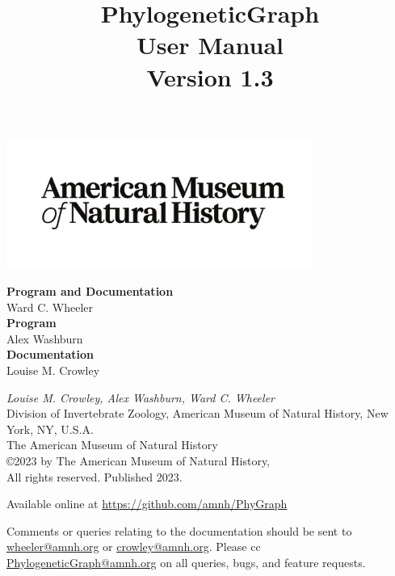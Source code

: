 \documentclass[11pt]{book}
\begin{document}
	
	\title{PhylogeneticGraph\\User Manual\\Version 1.3}
	
	\maketitle 
	
	\newpage

	 \begin{center}
		\includegraphics[width=0.75\textwidth]{AMNHLogo.PDF}
	\end{center}

	\vspace*{2.50cm}
		
	\begin{flushleft}
		\textbf {Program and Documentation} \\ Ward C. Wheeler \\
		\vspace*{0.50cm}
		\textbf {Program} \\ Alex Washburn \\
		\vspace*{0.50cm}
		\textbf{Documentation} \\ Louise M. Crowley
	\end{flushleft}
	

	\vspace*{2.50cm}
	
	\begin{flushleft}
		\small
		{\it Louise M. Crowley, Alex Washburn, Ward C. Wheeler} \\
		
		Division of Invertebrate Zoology, American Museum of Natural History, New York, NY, U.S.A.\\
		\smallskip
		The American Museum of Natural History\\
		\copyright 2023 by The American Museum of Natural History, \\
		All rights reserved. Published 2023.
			
		\vspace*{0.25cm}
		
		Available online at \url{https://github.com/amnh/PhyGraph}
		
		Comments or queries relating to the documentation should be sent to \href{mailto:wheeler@amnh.org}
		{wheeler@amnh.org} or \href{mailto:crowley@amnh.org}{crowley@amnh.org}. Please cc  	
		\href{mailto:PhylogeneticGraph@amnh.org}{PhylogeneticGraph@amnh.org}
		on all queries, bugs,  and feature requests.
	
	\end{flushleft}
	
\end{document}
